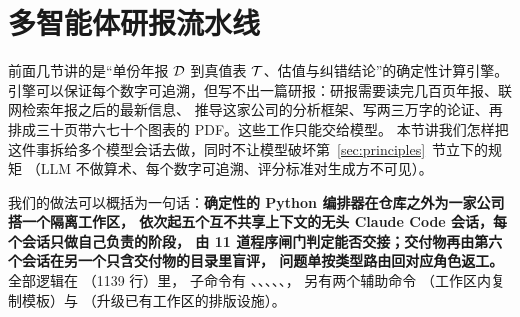 \section{多智能体研报流水线}
\label{sec:pipeline}

\usetikzlibrary{shapes.symbols}
\newcommand{\plW}{\mathcal{W}}                 %
\newcommand{\plmt}{\tau}                        %
\newcommand{\plG}[1]{\Gate_{#1}}                %
\newcommand{\plGh}[1]{\widehat{\Gate}_{#1}}     %
\newcommand{\plok}{\mathsf{ok}}
\newcommand{\plex}{\mathsf{exists}}
\newcommand{\plchars}{\operatorname{chars}}
\newcommand{\plsha}{\operatorname{sha256}}
\setlength{\emergencystretch}{3em}

前面几节讲的是“单份年报 $\mathcal{D}$ 到真值表 $\mathcal{T}$、估值与纠错结论”的确定性计算引擎。
引擎可以保证每个数字可追溯，但写不出一篇研报：研报需要读完几百页年报、联网检索年报之后的最新信息、
推导这家公司的分析框架、写两三万字的论证、再排成三十页带六七十个图表的 PDF。这些工作只能交给模型。
本节讲我们怎样把这件事拆给多个模型会话去做，同时不让模型破坏第~\ref{sec:principles}~节立下的规矩
（LLM 不做算术、每个数字可追溯、评分标准对生成方不可见）。

我们的做法可以概括为一句话：\textbf{确定性的 Python 编排器在仓库之外为一家公司搭一个隔离工作区，
依次起五个互不共享上下文的无头 Claude Code 会话，每个会话只做自己负责的阶段，
由 11 道程序闸门判定能否交接；交付物再由第六个会话在另一个只含交付物的目录里盲评，
问题单按类型路由回对应角色返工。}全部逻辑在 （1139 行）里，
子命令有 、、、、、，
另有两个辅助命令 （工作区内复制模板）与 （升级已有工作区的排版设施）。

